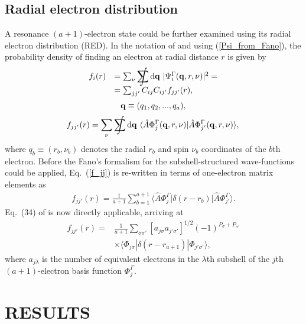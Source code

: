 \documentclass[aip
, pra
, showpacs
, aps
, twocolumn
, groupedaddress
, floatfix
]{revtex4}
\newcommand{\beq}{\begin{equation}}
\newcommand{\eeq}{\end{equation}}
\newcommand{\barr}{\begin{array}}
\newcommand{\earr}{\end{array}}
\newcommand{\dd}{\mbox{d}}
\newcommand{\isum}%
{\mathop{\hbox{$\displaystyle\sum\kern-13.2pt\int\kern1.5pt$}}}
\begin{document}
\subsection{Radial electron distribution}
A resonance $(a+1)$-electron state could be further examined using its radial electron distribution (RED).
In the notation of \citet{KFB11} and using (\ref{Psi_from_Fano}),
the probability density of finding an electron at radial distance $r$ is given by
\beq \barr{rl}
f_i(r) &= \sum_\nu \isum \dd {\bf q} \ |\Psi^\Gamma_i({\bf q}, r, \nu)|^2=\\
&= \sum_{jj'} C_{ij}C_{ij'} f_{jj'}(r),\\
\earr \label{f_i} \eeq
\beq
{\bf q} \equiv (q_1, q_2, ..., q_a),
\eeq
\beq
f_{jj'}(r) = \sum_\nu \isum \dd {\bf q} \
\langle \hat{A}\Phi^\Gamma_j({\bf q}, r, \nu) |\hat{A}\Phi^\Gamma_{j'}({\bf q}, r, \nu) \rangle,\\
\label{f_jj} \eeq
where $q_b \equiv (r_b, \nu_b)$ denotes the radial $r_b$ and spin $\nu_b$ coordinates of the $b$th electron.
Before the Fano's formalism \cite{Fano65,KFB11} for the subshell-structured wave-functions could be applied,
Eq.~(\ref{f_jj}) is re-written in terms of one-electron matrix elements as
\beq \barr{l}
f_{jj'}(r) = \frac{1}{a+1} \sum_{b=1}^{a+1}
\langle \hat{A}\Phi^\Gamma_j |  \delta(r-r_b)|\hat{A}\Phi^\Gamma_{j'} \rangle.
\earr \label{f_jj_delta} \eeq
Eq.~(34) of \cite{KFB11} is now directly applicable, arriving at
\beq \barr{rl}
f_{jj'}(r) =&  \frac{1}{a+1} \sum_{\sigma \sigma'} [a_{j \sigma}a_{j' \sigma'}]^{1/2}
 (-1)^{P_\sigma + P_{\sigma'}} \\
& \times \langle \Phi_{j \sigma} | \delta(r-r_{a+1}) |\Phi_{j' \sigma'} \rangle,
\earr \label{RED} \eeq
where $a_{j\lambda}$ is the number of equivalent electrons in the $\lambda$th subshell
of the $j$th $(a+1)$-electron basis function $\Phi_j^\Gamma$.








\section{RESULTS}
\end{document}
